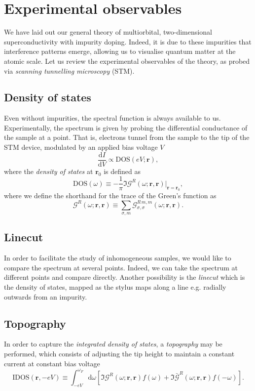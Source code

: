 \section{Experimental observables}
\label{sec:general_observables}
We have laid out our general theory of multiorbital, two-dimensional superconductivity with impurity doping. Indeed, it is due to these impurities that interference patterns emerge, allowing us to visualise quantum matter at the atomic scale.
Let us review the experimental observables of the theory, as probed via \textit{scanning tunnelling microscopy} (STM). 

\subsection{Density of states}
Even without impurities, the spectral function is always available to us. Experimentally, the spectrum is given by probing the differential conductance of the sample at a point. That is, electrons tunnel from the sample to the tip of the STM device, modulated by an applied bias voltage $V$
\begin{equation}
\frac{\text{d}I}{\text{d}V}\propto \text{DOS}(eV;\mathbf{r}),
\end{equation}
where the \textit{density of states} at $\mathbf{r}_0$ is defined as
\begin{equation}
\text{DOS}(\omega) \equiv  -\frac{1}{\pi}
 \Im{\mathcal{G}}^{R}\left(\omega; \mathbf{r}, \mathbf{r}\right)\Big|_{\mathbf{r}=\mathbf{r}_0},
\end{equation}
where we define the shorthand for the trace of the Green's function as
\begin{equation}
 \mathcal{G}^{R}\left(\omega; \mathbf{r}, \mathbf{r}\right)
\equiv
 \sum_{\sigma,m}
 \mathcal{G}_{\sigma,\sigma}^{R\,m,m}\left(\omega; \mathbf{r}, \mathbf{r}\right).
\end{equation}

\subsection{Linecut}
In order to facilitate the study of inhomogeneous samples, we would like to compare the spectrum at several points. Indeed, we can take the spectrum at different points and compare directly. Another possibility is the \textit{linecut} which is the density of states, mapped as the stylus maps along a line e.g. radially outwards from an impurity.

\subsection{Topography}
In order to capture the \textit{integrated density of states}, a \textit{topography} may be performed, which consists of adjusting the tip height to maintain a constant current at constant bias voltage
\begin{equation}
\text{IDOS}(\mathbf{r}, -eV)
\equiv
\int^{\omega_F}_{-eV}\text{d}\omega
\left[
 \Im{\mathcal{G}}^{R}\left(\omega; \mathbf{r}, \mathbf{r}\right)f(\omega)
 +
  \Im{\bar{\mathcal{G}}}^{R}\left(\omega; \mathbf{r}, \mathbf{r}\right)f(-\omega)
  \right].
\end{equation}

